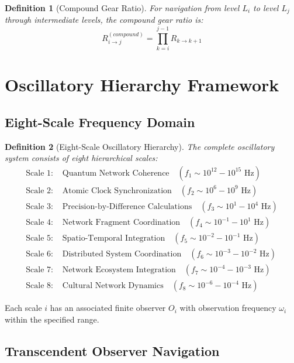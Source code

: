 \documentclass[12pt,a4paper]{article}
\newtheorem{definition}{Definition}
\begin{document}
\begin{definition}[Compound Gear Ratio]
For navigation from level $L_i$ to level $L_j$ through intermediate levels, the compound gear ratio is:
\begin{equation}
R_{i \to j}^{(compound)} = \prod_{k=i}^{j-1} R_{k \to k+1}
\label{eq:compound_gear_ratio}
\end{equation}
\end{definition}

\section{Oscillatory Hierarchy Framework}

\subsection{Eight-Scale Frequency Domain}

\begin{definition}[Eight-Scale Oscillatory Hierarchy]
The complete oscillatory system consists of eight hierarchical scales:
\begin{align}
\text{Scale 1: } &\text{Quantum Network Coherence} \quad (f_1 \sim 10^{12}-10^{15} \text{ Hz}) \\
\text{Scale 2: } &\text{Atomic Clock Synchronization} \quad (f_2 \sim 10^6-10^9 \text{ Hz}) \\
\text{Scale 3: } &\text{Precision-by-Difference Calculations} \quad (f_3 \sim 10^1-10^4 \text{ Hz}) \\
\text{Scale 4: } &\text{Network Fragment Coordination} \quad (f_4 \sim 10^{-1}-10^1 \text{ Hz}) \\
\text{Scale 5: } &\text{Spatio-Temporal Integration} \quad (f_5 \sim 10^{-2}-10^{-1} \text{ Hz}) \\
\text{Scale 6: } &\text{Distributed System Coordination} \quad (f_6 \sim 10^{-3}-10^{-2} \text{ Hz}) \\
\text{Scale 7: } &\text{Network Ecosystem Integration} \quad (f_7 \sim 10^{-4}-10^{-3} \text{ Hz}) \\
\text{Scale 8: } &\text{Cultural Network Dynamics} \quad (f_8 \sim 10^{-6}-10^{-4} \text{ Hz})
\end{align}
\end{definition}

Each scale $i$ has an associated finite observer $O_i$ with observation frequency $\omega_i$ within the specified range.

\subsection{Transcendent Observer Navigation}
\end{document}
